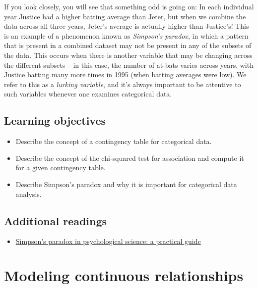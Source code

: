 \documentclass[
  12pt,
]{book}
\providecommand{\tightlist}{%
  \setlength{\itemsep}{0pt}\setlength{\parskip}{0pt}}
\begin{document}
If you look closely, you will see that something odd is going on: In each individual year Justice had a higher batting average than Jeter, but when we combine the data across all three years, Jeter's average is actually higher than Justice's! This is an example of a phenomenon known as \emph{Simpson's paradox}, in which a pattern that is present in a combined dataset may not be present in any of the subsets of the data. This occurs when there is another variable that may be changing across the different subsets -- in this case, the number of at-bats varies across years, with Justice batting many more times in 1995 (when batting averages were low). We refer to this as a \emph{lurking variable}, and it's always important to be attentive to such variables whenever one examines categorical data.

\hypertarget{learning-objectives-11}{%
\section{Learning objectives}\label{learning-objectives-11}}

\begin{itemize}
\tightlist
\item
  Describe the concept of a contingency table for categorical data.
\item
  Describe the concept of the chi-squared test for association and compute it for a given contingency table.
\item
  Describe Simpson's paradox and why it is important for categorical data analysis.
\end{itemize}

\hypertarget{additional-readings}{%
\section{Additional readings}\label{additional-readings}}

\begin{itemize}
\tightlist
\item
  \href{https://www.frontiersin.org/articles/10.3389/fpsyg.2013.00513/full}{Simpson's paradox in psychological science: a practical guide}
\end{itemize}

\hypertarget{modeling-continuous-relationships}{%
\chapter{Modeling continuous relationships}\label{modeling-continuous-relationships}}
\end{document}

